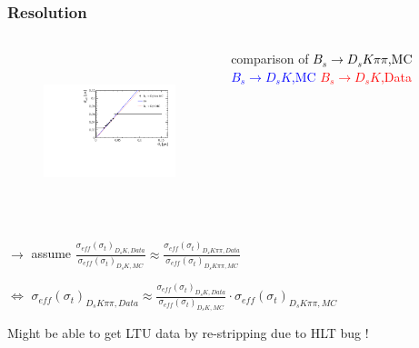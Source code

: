 \documentclass[]{beamer}
\begin{document}
\begin{frame}
\frametitle{Resolution}

\vspace{-1cm}

\begin{columns}


\begin{figure}
\includegraphics[width=6.0cm,height=4.7cm]{plots/ProperTimeReso_MC.pdf}
\end{figure}




comparison of \newline  
\textcolor{black}{$B_{s}\to D_{s}K\pi\pi$,MC} \newline
 \textcolor{blue}{$B_{s}\to D_{s}K$,MC} \newline
 \textcolor{red}{$B_{s}\to D_{s}K$,Data}



\end{columns}

$\rightarrow$ assume $\frac{\sigma_{eff}(\sigma_{t})_{D_{s}K,Data}}{\sigma_{eff}(\sigma_{t})_{D_{s}K,MC}} \approx \frac{\sigma_{eff}(\sigma_{t})_{D_{s}K\pi\pi,Data}}{\sigma_{eff}(\sigma_{t})_{D_{s}K\pi\pi,MC}}$ \newline

$\Leftrightarrow$ $\sigma_{eff}(\sigma_{t})_{D_{s}K\pi\pi,Data} \approx \frac{\sigma_{eff}(\sigma_{t})_{D_{s}K,Data}}{\sigma_{eff}(\sigma_{t})_{D_{s}K,MC}} \cdot \sigma_{eff}(\sigma_{t})_{D_{s}K\pi\pi,MC}$

\bigskip

\bfseries

Might be able to get LTU data by re-stripping due to HLT bug !

\normalfont

\end{frame}
\end{document}
